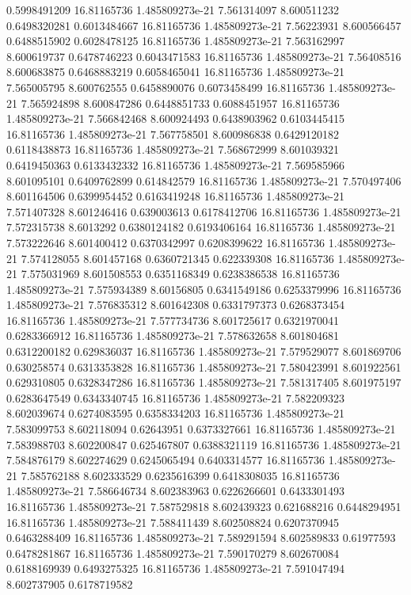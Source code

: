{0.5998491209 16.81165736 1.485809273e-21 7.561314097 8.600511232 0.6498320281
0.6013484667 16.81165736 1.485809273e-21 7.56223931 8.600566457 0.6488515902
0.6028478125 16.81165736 1.485809273e-21 7.563162997 8.600619737 0.6478746223
0.6043471583 16.81165736 1.485809273e-21 7.56408516 8.600683875 0.6468883219
0.6058465041 16.81165736 1.485809273e-21 7.565005795 8.600762555 0.6458890076
0.6073458499 16.81165736 1.485809273e-21 7.565924898 8.600847286 0.6448851733
0.6088451957 16.81165736 1.485809273e-21 7.566842468 8.600924493 0.6438903962
0.6103445415 16.81165736 1.485809273e-21 7.567758501 8.600986838 0.6429120182
0.6118438873 16.81165736 1.485809273e-21 7.568672999 8.601039321 0.6419450363
0.6133432332 16.81165736 1.485809273e-21 7.569585966 8.601095101 0.6409762899
0.614842579 16.81165736 1.485809273e-21 7.570497406 8.601164506 0.6399954452
0.6163419248 16.81165736 1.485809273e-21 7.571407328 8.601246416 0.639003613
0.6178412706 16.81165736 1.485809273e-21 7.572315738 8.6013292 0.6380124182
0.6193406164 16.81165736 1.485809273e-21 7.573222646 8.601400412 0.6370342997
0.6208399622 16.81165736 1.485809273e-21 7.574128055 8.601457168 0.6360721345
0.622339308 16.81165736 1.485809273e-21 7.575031969 8.601508553 0.6351168349
0.6238386538 16.81165736 1.485809273e-21 7.575934389 8.60156805 0.6341549186
0.6253379996 16.81165736 1.485809273e-21 7.576835312 8.601642308 0.6331797373
0.6268373454 16.81165736 1.485809273e-21 7.577734736 8.601725617 0.6321970041
0.6283366912 16.81165736 1.485809273e-21 7.578632658 8.601804681 0.6312200182
0.629836037 16.81165736 1.485809273e-21 7.579529077 8.601869706 0.630258574
0.6313353828 16.81165736 1.485809273e-21 7.580423991 8.601922561 0.629310805
0.6328347286 16.81165736 1.485809273e-21 7.581317405 8.601975197 0.6283647549
0.6343340745 16.81165736 1.485809273e-21 7.582209323 8.602039674 0.6274083595
0.6358334203 16.81165736 1.485809273e-21 7.583099753 8.602118094 0.62643951
0.6373327661 16.81165736 1.485809273e-21 7.583988703 8.602200847 0.625467807
0.6388321119 16.81165736 1.485809273e-21 7.584876179 8.602274629 0.6245065494
0.6403314577 16.81165736 1.485809273e-21 7.585762188 8.602333529 0.6235616399
0.6418308035 16.81165736 1.485809273e-21 7.586646734 8.602383963 0.6226266601
0.6433301493 16.81165736 1.485809273e-21 7.587529818 8.602439323 0.621688216
0.6448294951 16.81165736 1.485809273e-21 7.588411439 8.602508824 0.6207370945
0.6463288409 16.81165736 1.485809273e-21 7.589291594 8.602589833 0.61977593
0.6478281867 16.81165736 1.485809273e-21 7.590170279 8.602670084 0.6188169939
0.6493275325 16.81165736 1.485809273e-21 7.591047494 8.602737905 0.6178719582
}
